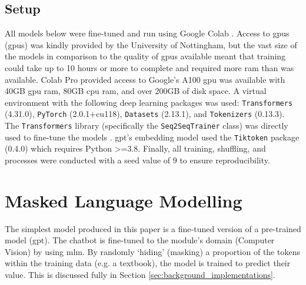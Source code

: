 \subsection{Setup} \label{sec:design_setup}
All models below were fine-tuned and run using Google Colab \citep{Bisong2019}. Access to \acrlong{gpu}s (\acrshort{gpu}s) was kindly provided by the University of Nottingham, but the vast size of the models in comparison to the quality of \acrshort{gpu}s available meant that training could take up to 10 hours or more to complete and required more \acrshort{ram} than was available. Colab Pro provided access to Google's A100 \acrshort{gpu} was available with 40GB \acrshort{gpu} \acrshort{ram}, 80GB \acrshort{cpu} \acrshort{ram}, and over 200GB of disk space. A virtual environment with the following deep learning packages was used:  \texttt{Transformers} (4.31.0), \texttt{PyTorch} (2.0.1+cu118), \texttt{Datasets} (2.13.1), and \texttt{Tokenizers} (0.13.3). The  \texttt{Transformers} library (specifically the \texttt{Seq2SeqTrainer} class) was directly used to fine-tune the models \citep{wolf2020huggingfaces}. \acrshort{gpt}'s embedding model used the \texttt{Tiktoken} package (0.4.0) which requires Python >=3.8. Finally, all training, shuffling, and processes were conducted with a seed value of 9 to ensure reproducibility.

\section{Masked Language Modelling}\label{sec:methodology_mlm}
The simplest model produced in this paper is a fine-tuned version of a pre-trained model (\acrshort{gpt}). The chatbot is fine-tuned to the module's domain (Computer Vision) by using \acrfull{mlm}. By randomly `hiding' (masking) a proportion of the tokens within the training data (e.g. a textbook), the model is trained to predict their value. This is discussed fully in Section \ref{sec:background_implementations}.

